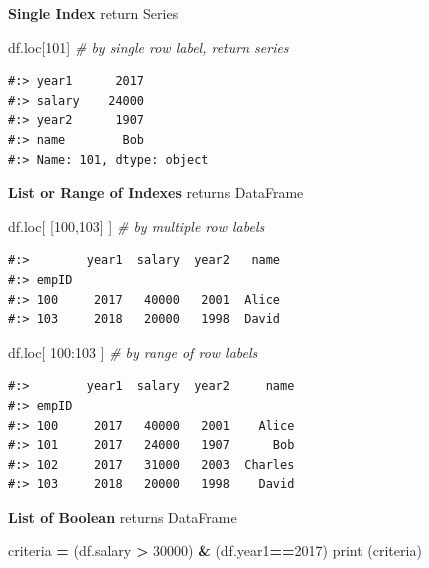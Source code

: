\documentclass[
]{book}
\newenvironment{Shaded}{\begin{snugshade}}{\end{snugshade}}
\newcommand{\BuiltInTok}[1]{#1}
\newcommand{\CommentTok}[1]{\textcolor[rgb]{0.37,0.37,0.37}{\textit{#1}}}
\newcommand{\DecValTok}[1]{\textcolor[rgb]{0.06,0.06,0.06}{#1}}
\newcommand{\NormalTok}[1]{#1}
\newcommand{\OperatorTok}[1]{\textcolor[rgb]{0.43,0.43,0.43}{\textbf{#1}}}
\begin{document}
\textbf{Single Index} return Series

\begin{Shaded}
\begin{Highlighting}[]
\NormalTok{df.loc[}\DecValTok{101}\NormalTok{]         }\CommentTok{# by single row label, return series}
\end{Highlighting}
\end{Shaded}

\begin{verbatim}
#:> year1      2017
#:> salary    24000
#:> year2      1907
#:> name        Bob
#:> Name: 101, dtype: object
\end{verbatim}

\textbf{List or Range of Indexes} returns DataFrame

\begin{Shaded}
\begin{Highlighting}[]
\NormalTok{df.loc[ [}\DecValTok{100}\NormalTok{,}\DecValTok{103}\NormalTok{] ]  }\CommentTok{# by multiple row labels}
\end{Highlighting}
\end{Shaded}

\begin{verbatim}
#:>        year1  salary  year2   name
#:> empID                             
#:> 100     2017   40000   2001  Alice
#:> 103     2018   20000   1998  David
\end{verbatim}

\begin{Shaded}
\begin{Highlighting}[]
\NormalTok{df.loc[  }\DecValTok{100}\NormalTok{:}\DecValTok{103}\NormalTok{  ]  }\CommentTok{# by range of row labels}
\end{Highlighting}
\end{Shaded}

\begin{verbatim}
#:>        year1  salary  year2     name
#:> empID                               
#:> 100     2017   40000   2001    Alice
#:> 101     2017   24000   1907      Bob
#:> 102     2017   31000   2003  Charles
#:> 103     2018   20000   1998    David
\end{verbatim}

\textbf{List of Boolean} returns DataFrame

\begin{Shaded}
\begin{Highlighting}[]
\NormalTok{criteria }\OperatorTok{=}\NormalTok{ (df.salary }\OperatorTok{>} \DecValTok{30000}\NormalTok{) }\OperatorTok{&}\NormalTok{ (df.year1}\OperatorTok{==}\DecValTok{2017}\NormalTok{)}
\BuiltInTok{print}\NormalTok{ (criteria)}
\end{Highlighting}
\end{Shaded}
\end{document}
